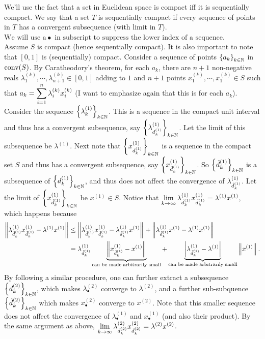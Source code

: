 \begin{enumerate}[leftmargin=*]
We'll use the fact that a set in Euclidean space is compact iff it is sequentially compact. We say that a set $T$ is sequentially compact if every sequence of points in $T$ has a convergent subsequence (with limit in $T$). $\boxed{\text{We will use a}\bullet \text{ in subscript to suppress the lower index of a sequence}.}$\\
Assume $S$ is compact (hence sequentially compact). It is also important to note that $[0,1]$ is (sequentially) compact. Consider a sequence of points $\left\{a_{k}\right\}_{{k\in\mathbb{N}}}$ in $\text{conv}(S)$. By Caratheodory's theorem, for each $a_{k}$, there are $n+1$ non-negative reals $\lambda^{(k)}_{1},\cdots,\lambda^{(k)}_{n+1}\in[0,1]$ adding to $1$ and $n+1$ points $x^{(k)}_{1}, \cdots,x^{(k)}_{1}\in S$ such that $\displaystyle a_{k} = \sum_{i=1}^{n}\lambda^{(k)}_{i}x^{(k)}_{i}$ (I want to emphasize again that this is for each $a_{k}$). \\
Consider the sequence $\left\{\lambda^{(1)}_{k}\right\}_{k\in\mathbb{N}}$. This is a sequence in the compact unit interval and thus has a convergent subsequence, say $\left\{\lambda^{(1)}_{d^{(1)}_{k}}\right\}_{k\in\mathbb{N}}$. Let the limit of this subsequence be $\lambda^{(1)}$. Next note that $\displaystyle\left\{x^{(1)}_{d^{(1)}_{k}}\right\}_{k\in\mathbb{N}}$ is a sequence in the compact set $S$ and thus has a convergent subsequence, say $\left\{x^{(1)}_{{\tilde{d}}^{(1)}_{k}}\right\}_{k\in\mathbb{N}}$. So $\left\{{\tilde{d}}^{(1)}_{k}\right\}_{k\in\mathbb{N}}$ is a subsequence of $\left\{d^{(1)}_{k}\right\}_{k\in\mathbb{N}}$, and thus does not affect the convergence of $\lambda^{(1)}_{{\tilde{d}}^{(1)}_{k}}$. Let the limit of $\left\{x^{(1)}_{{\tilde{d}}^{(1)}_{k}}\right\}_{k\in\mathbb{N}}$ be $x^{(1)}\in S$. Notice that $\displaystyle\lim_{{k\to\infty}}\lambda^{(1)}_{{\tilde{d}}^{(1)}_{k}}x^{(1)}_{{\tilde{d}}^{(1)}_{k}} = \lambda^{(1)}x^{(1)}$, which happens because
\begin{align*}\displaystyle\left\lVert \lambda^{(1)}_{{\tilde{d}}^{(1)}_{k}}x^{(1)}_{{\tilde{d}}^{(1)}_{k}} - \lambda^{(1)}x^{(1)} \right\rVert_{}
&\leq \left\lVert \lambda^{(1)}_{{\tilde{d}}^{(1)}_{k}}x^{(1)}_{{\tilde{d}}^{(1)}_{k}} - \lambda^{(1)}_{{\tilde{d}}^{(1)}_{k}}x^{(1)} \right\rVert_{} + \left\lVert \lambda^{(1)}_{{\tilde{d}}^{(1)}_{k}}x^{(1)} - \lambda^{(1)}x^{(1)} \right\rVert_{}\\
&= \lambda^{(1)}_{{\tilde{d}}^{(1)}_{k}}\underbrace{\left\lVert x^{(1)}_{{\tilde{d}}^{(1)}_{k}} - x^{(1)} \right\rVert_{}}_{\text{can be made arbitrarily small}} + \underbrace{\left| \lambda^{(1)}_{{\tilde{d}}^{(1)}_{k}} - \lambda^{(1)} \right|}_{{\text{can be made arbitrarily small}}} \left\lVert x^{(1)} \right\rVert_{}.
\end{align*}
By following a similar procedure, one can further extract a subsequence $\left\{d^{(2)}_{k}\right\}_{k\in\mathbb{N}}$, which makes $\lambda^{(2)}_{\bullet}$ converge to $\lambda^{(2)}$, and a further sub-subquence $\left\{{\tilde{d}}^{(2)}_{k}\right\}_{k\in\mathbb{N}}$ which makes $x^{(2)}_{\bullet}$ converge to $x^{(2)}$. Note that this smaller sequence does not affect the convergence of $\lambda^{(1)}_{\bullet}$ and $x^{(1)}_{\bullet}$ (and also their product). By the same argument as above, $\displaystyle\lim_{{k\to\infty}}\lambda^{(2)}_{{\tilde{d}}^{(2)}_{k}}x^{(2)}_{{\tilde{d}}^{(2)}_{k}} = \lambda^{(2)}x^{(2)}$. \\

\end{enumerate}

